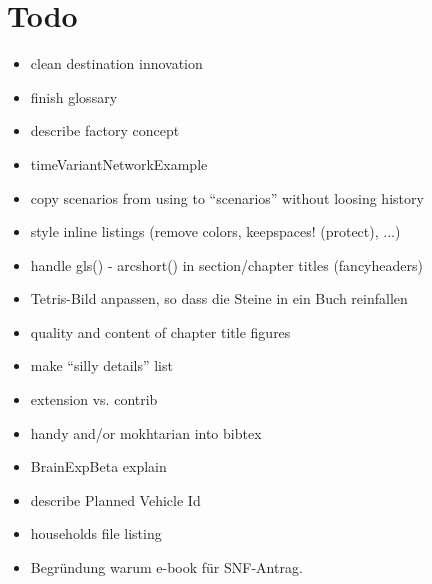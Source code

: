 \section*{Todo}

\begin{itemize}\styleItemize

\item clean destination innovation

\item finish glossary

\item describe factory concept

\item timeVariantNetworkExample

\item copy scenarios from using to ``scenarios'' without loosing history

\item style inline listings (remove colors, keepspaces! (protect), ...)

\item handle gls() - arcshort() in section/chapter titles (fancyheaders)

\item Tetris-Bild anpassen, so dass die Steine in ein Buch reinfallen

\item quality and content of chapter title figures

\item make ``silly details'' list

\item extension vs. contrib

\item handy and/or mokhtarian into bibtex

\item BrainExpBeta explain

\item describe Planned Vehicle Id

\item households file listing

\item Begründung warum e-book für SNF-Antrag.





\end{itemize}
